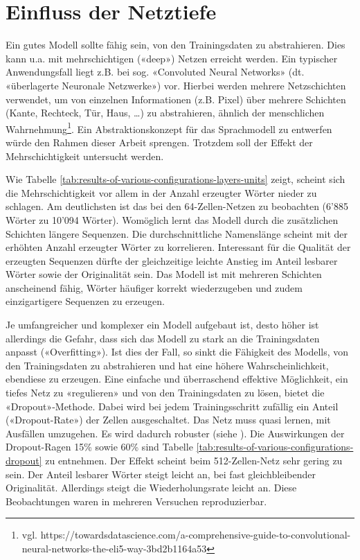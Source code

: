 \section{Einfluss der Netztiefe}
\label{sec:increase-lstm-layers}

Ein gutes Modell sollte fähig sein, von den Trainingsdaten zu abstrahieren.
Dies kann u.a. mit mehrschichtigen («deep») Netzen erreicht werden.
Ein typischer Anwendungsfall liegt z.B. bei sog. «Convoluted Neural Networks» (dt. «überlagerte Neuronale Netzwerke») vor.
Hierbei werden mehrere Netzschichten verwendet, um von einzelnen Informationen (z.B. Pixel) über mehrere
Schichten (Kante, Rechteck, Tür, Haus, …) zu abstrahieren, ähnlich der menschlichen Wahrnehmung\footnote{vgl. https://towardsdatascience.com/a-comprehensive-guide-to-convolutional-neural-networks-the-eli5-way-3bd2b1164a53}.
Ein Abstraktionskonzept für das Sprachmodell zu entwerfen würde den Rahmen dieser Arbeit sprengen.
Trotzdem soll der Effekt der Mehrschichtigkeit untersucht werden.

Wie Tabelle \ref{tab:results-of-various-configurations-layers-units} zeigt, scheint sich die Mehrschichtigkeit
vor allem in der Anzahl erzeugter Wörter nieder zu schlagen.
Am deutlichsten ist das bei den 64-Zellen-Netzen zu beobachten (6'885 Wörter zu 10'094 Wörter).
Womöglich lernt das Modell durch die zusätzlichen Schichten längere Sequenzen.
Die durchschnittliche Namenslänge scheint mit der erhöhten Anzahl erzeugter Wörter zu korrelieren.
Interessant für die Qualität der erzeugten Sequenzen dürfte der gleichzeitige leichte Anstieg im Anteil lesbarer Wörter sowie der Originalität sein.
Das Modell ist mit mehreren Schichten anscheinend fähig, Wörter häufiger korrekt wiederzugeben und zudem einzigartigere Sequenzen zu erzeugen.

Je umfangreicher und komplexer ein Modell aufgebaut ist, desto höher ist allerdings die Gefahr, dass sich das Modell zu stark an die Trainingsdaten anpasst («Overfitting»).
Ist dies der Fall, so sinkt die Fähigkeit des Modells, von den Trainingsdaten zu abstrahieren und hat eine höhere Wahrscheinlichkeit, ebendiese zu erzeugen.
Eine einfache und überraschend effektive Möglichkeit, ein tiefes Netz zu «regulieren» und von den Trainingsdaten zu lösen, bietet die «Dropout»-Methode.
Dabei wird bei jedem Trainingsschritt zufällig ein Anteil («Dropout-Rate») der Zellen ausgeschaltet.
Das Netz muss quasi lernen, mit Ausfällen umzugehen.
Es wird dadurch robuster (siehe \autocite{JMLR:v15:srivastava14a}).
Die Auswirkungen der Dropout-Ragen 15\% sowie 60\% sind Tabelle \ref{tab:results-of-various-configurations-dropout} zu entnehmen.
Der Effekt scheint beim 512-Zellen-Netz sehr gering zu sein.
Der Anteil lesbarer Wörter steigt leicht an, bei fast gleichbleibender Originalität.
Allerdings steigt die Wiederholungsrate leicht an.
Diese Beobachtungen waren in mehreren Versuchen reproduzierbar.


